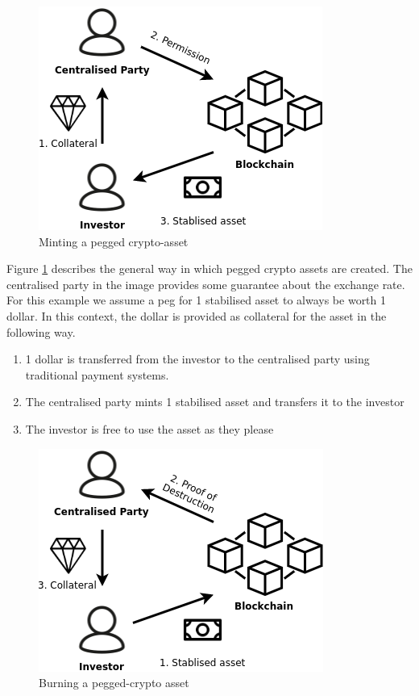 \documentclass[english,]{IEEEtran}
\providecommand{\tightlist}{%
  \setlength{\itemsep}{0pt}\setlength{\parskip}{0pt}}
\begin{document}
\begin{figure}[htbp]
\centering
\includegraphics{img/Centralised_create.png}
\caption{Minting a pegged crypto-asset \label{cent_create_label}}
\end{figure}

Figure \ref{cent_create_label} describes the general way in which pegged
crypto assets are created. The centralised party in the image provides
some guarantee about the exchange rate. For this example we assume a peg
for 1 stabilised asset to always be worth 1 dollar. In this context, the
dollar is provided as collateral for the asset in the following way.

\begin{enumerate}
\def\labelenumi{\arabic{enumi}.}
\tightlist
\item
  1 dollar is transferred from the investor to the centralised party
  using traditional payment systems.
\item
  The centralised party mints 1 stabilised asset and transfers it to the
  investor
\item
  The investor is free to use the asset as they please
\end{enumerate}

\begin{figure}[htbp]
\centering
\includegraphics{img/Centralised_destroy.png}
\caption{Burning a pegged-crypto asset \label{cent_destoy_label}}
\end{figure}
\end{document}
